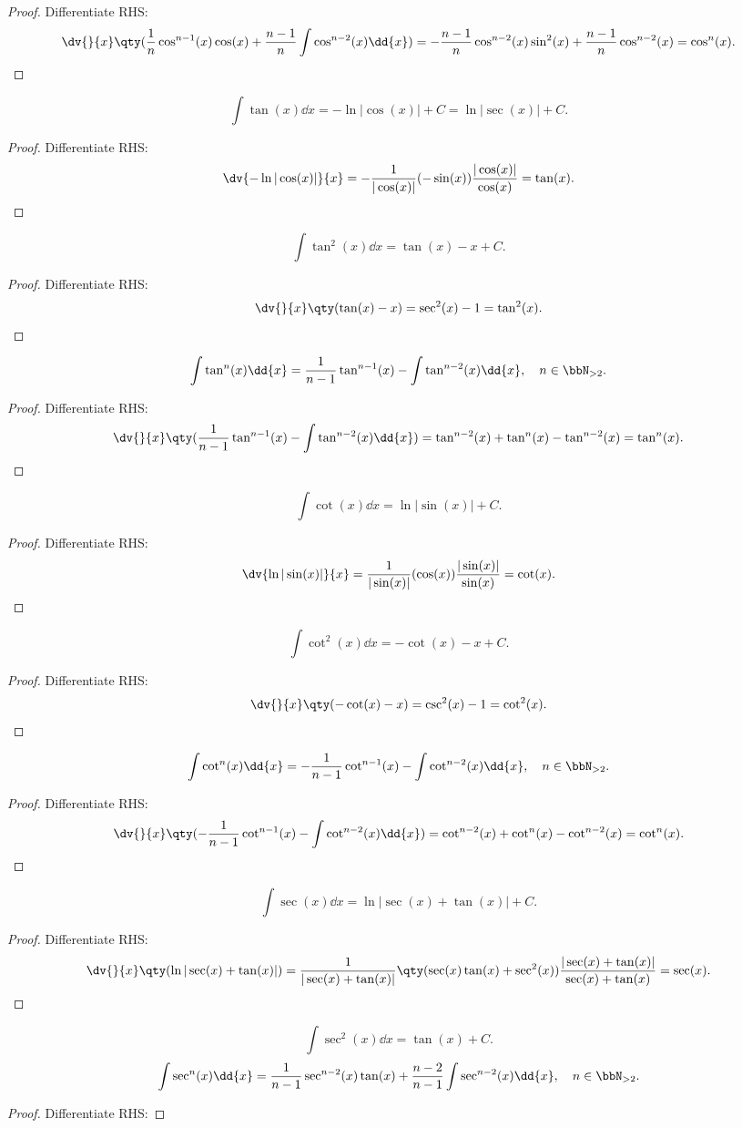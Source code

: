 \documentclass[a4paper,12pt]{report}
\begin{document}
\begin{itemize}
\begin{itemize}
\begin{proof}
    Differentiate RHS:
    \[\dv{}{x}\qty(\frac{1}{n}\cos^{n-1}(x)\cos(x)+\frac{n-1}{n}\int\cos^{n-2}(x)\dd{x})=-\frac{n-1}{n}\cos^{n-2}(x)\sin^2(x)+\frac{n-1}{n}\cos^{n-2}(x)=\cos^n(x).\]
\end{proof}
\[\int\tan(x)\dd{x}=-\ln|\cos(x)|+C=\ln|\sec(x)|+C.\]
\begin{proof}
    Differentiate RHS:
    \[\dv{-\ln|\cos(x)|}{x}=-\frac{1}{|\cos(x)|}(-\sin(x))\frac{|\cos(x)|}{\cos(x)}=\tan(x).\]
\end{proof}
\[\int\tan^2(x)\dd{x}=\tan(x)-x+C.\]
\begin{proof}
    Differentiate RHS:
    \[\dv{}{x}\qty(\tan(x)-x)=\sec^2(x)-1=\tan^2(x).\]
\end{proof}
\[\int\tan^n(x)\dd{x}=\frac{1}{n-1}\tan^{n-1}(x)-\int\tan^{n-2}(x)\dd{x},\quad n\in\bbN_{>2}.\]
\begin{proof}
    Differentiate RHS:
    \[\dv{}{x}\qty(\frac{1}{n-1}\tan^{n-1}(x)-\int\tan^{n-2}(x)\dd{x})=\tan^{n-2}(x)+\tan^n(x)-\tan^{n-2}(x)=\tan^n(x).\]
\end{proof}
\[\int\cot(x)\dd{x}=\ln|\sin(x)|+C.\]
\begin{proof}
    Differentiate RHS:
    \[\dv{\ln|\sin(x)|}{x}=\frac{1}{|\sin(x)|}(\cos(x))\frac{|\sin(x)|}{\sin(x)}=\cot(x).\]
\end{proof}
\[\int\cot^2(x)\dd{x}=-\cot(x)-x+C.\]
\begin{proof}
    Differentiate RHS:
    \[\dv{}{x}\qty(-\cot(x)-x)=\csc^2(x)-1=\cot^2(x).\]
\end{proof}
\[\int\cot^n(x)\dd{x}=-\frac{1}{n-1}\cot^{n-1}(x)-\int\cot^{n-2}(x)\dd{x},\quad n\in\bbN_{>2}.\]
\begin{proof}
    Differentiate RHS:
    \[\dv{}{x}\qty(-\frac{1}{n-1}\cot^{n-1}(x)-\int\cot^{n-2}(x)\dd{x})=\cot^{n-2}(x)+\cot^n(x)-\cot^{n-2}(x)=\cot^n(x).\]
\end{proof}
\[\int\sec(x)\dd{x}=\ln|\sec(x)+\tan(x)|+C.\]
\begin{proof}
    Differentiate RHS:
    \[\dv{}{x}\qty(\ln|\sec(x)+\tan(x)|)=\frac{1}{|\sec(x)+\tan(x)|}\qty(\sec(x)\tan(x)+\sec^2(x))\frac{|\sec(x)+\tan(x)|}{\sec(x)+\tan(x)}=\sec(x).\]
\end{proof}
\[\int\sec^2(x)\dd{x}=\tan(x)+C.\]
\[\int\sec^n(x)\dd{x}=\frac{1}{n-1}\sec^{n-2}(x)\tan(x)+\frac{n-2}{n-1}\int\sec^{n-2}(x)\dd{x},\quad n\in\bbN_{>2}.\]
\begin{proof}
    Differentiate RHS:

\end{proof}
\end{itemize}
\end{itemize}
\end{document}
